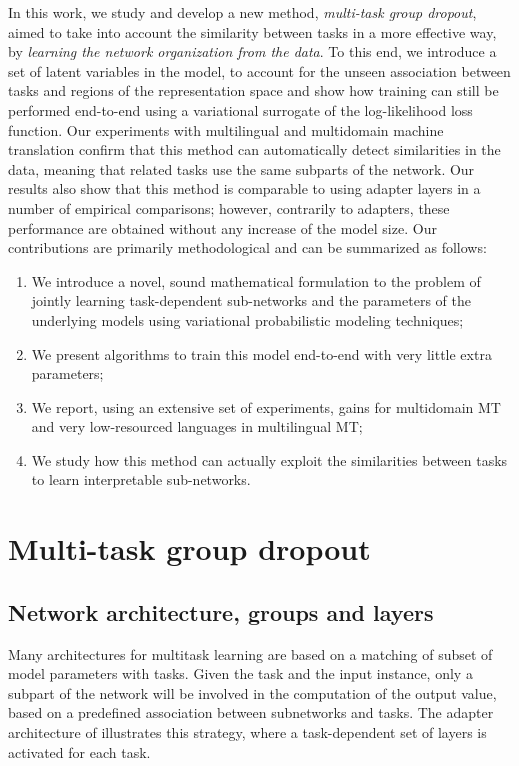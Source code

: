 \documentclass[11pt]{article}
\newcommand{\fyDone}[1]{\done[FY]\Todo[FY:]{\textcolor{orange}{#1}}}
\begin{document}
In this work, we study and develop a new method, \emph{multi-task group dropout}, aimed to take into account the similarity between tasks in a more effective way, by \emph{learning the network organization from the data}. To this end, we introduce a set of latent variables in the model, to account for the unseen association between tasks and regions of the representation space and show how training can still be performed end-to-end using a variational surrogate of the log-likelihood loss function. Our experiments with multilingual and multidomain machine translation confirm that this method can automatically detect similarities in the data, meaning that related tasks use the same subparts of the network. Our results also show that this method is comparable to using adapter layers in a number of empirical comparisons; however, contrarily to adapters, these performance are obtained without any increase of the model size. Our contributions are primarily methodological and can be summarized as follows:
\begin{enumerate}
  \setlength{\itemsep}{1pt}
  \setlength{\parskip}{0pt}
  \setlength{\parsep}{0pt}
\item We introduce a novel, sound mathematical formulation to the problem of jointly learning task-dependent sub-networks and the parameters of the underlying models using variational probabilistic modeling techniques;
\item We present algorithms to train this model end-to-end with very little extra parameters;
\item We report, using an extensive set of experiments, gains for multidomain MT and very low-resourced languages in multilingual MT;
\item We study how this method can actually exploit the similarities between tasks to learn interpretable sub-networks.
\end{enumerate}
\fyDone{Can you do distillation ? That is only keep the parameter for one domain and still get good results (better than DA ?)}

\section{Multi-task group dropout \label{sec:architecture}}
\subsection{Network architecture, groups and layers}
Many architectures for multitask learning are based on a matching of subset of model parameters with tasks. Given the task and the input instance, only a subpart of the network will be involved in the computation of the output value, based on a predefined association between subnetworks and tasks. The adapter architecture of \citep{Bapna19simple} illustrates this strategy, where a task-dependent set of layers is activated for each task. 
\end{document}
